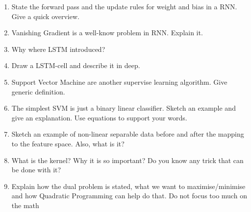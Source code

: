 \documentclass[11pt]{article}
\begin{document}
\begin{enumerate}
	\item State the forward pass and the update rules for weight and bias in a RNN. Give a quick overview.
	\item Vanishing Gradient is a well-know problem in RNN. Explain it.
	\item Why where LSTM introduced?
	\item Draw a LSTM-cell and describe it in deep.
	\item Support Vector Machine are another supervise learning algorithm. Give generic definition.
	\item The simplest SVM is just a binary linear classifier. Sketch an example and give an explanation. Use equations to support your words.
	\item Sketch an example of non-linear separable data before and after the mapping to the feature space. Also, what is it?
	\item What is the kernel? Why it is so important? Do you know any trick that can be done with it?
	\item Explain how the dual problem is stated, what we want to maximise/minimise and how Quadratic Programming can help do that. Do not focus too much on the math
\end{enumerate}
\end{document}
